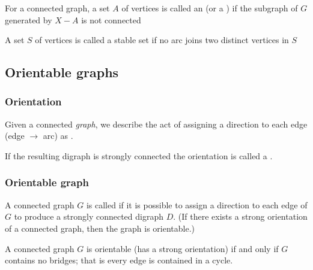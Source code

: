 \documentclass[aspectratio=43]{beamer}
\begin{document}
\begin{frame} 
	\begin{definition}
		For a connected graph, a set $A$ of vertices is called an  (or a ) if the subgraph of $G$ generated by $X-A$ is not connected
	\end{definition}
	\vfill
	\begin{definition}
		A set $S$ of vertices is called a stable set if no arc joins two distinct vertices in $S$
	\end{definition}
	\vfill
\end{frame}




\subsection{Orientable graphs}
\begin{frame}\frametitle{Orientation}
\begin{definition}
Given a connected \emph{graph}, we describe the act of assigning a direction to each edge (edge $\rightarrow$ arc) as .
\end{definition}
\begin{definition}
If the resulting digraph is strongly connected the orientation is called a .
\end{definition}
\end{frame}
 
 
\begin{frame}\frametitle{Orientable graph}
\begin{definition}
A connected graph $G$ is called  if it is possible to assign a direction to each edge of $G$ to produce a strongly connected digraph $D$.
(If there exists a strong orientation of a connected graph, then the graph is orientable.)
\end{definition}

\begin{theorem}
A connected graph $G$ is orientable (has a strong orientation) if and only if $G$ contains no bridges; that is every edge is contained in a cycle.
\end{theorem}
\end{frame}
 
\end{document}
